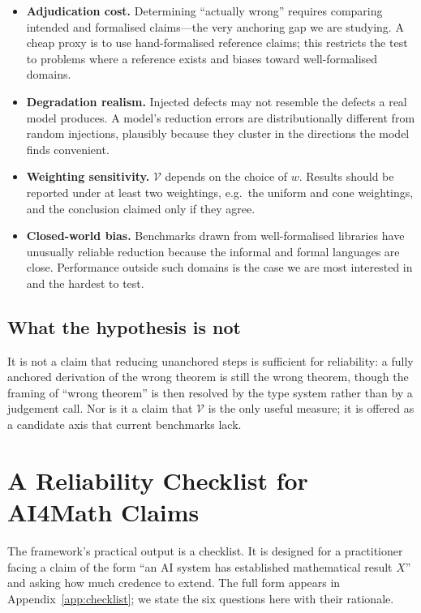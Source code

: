 \documentclass[11pt,a4paper]{article}
\theoremstyle{definition}
\theoremstyle{plain}
\theoremstyle{remark}
\newcommand{\V}{\mathcal{V}}           %
\begin{document}
\begin{itemize}
  \item \textbf{Adjudication cost.} Determining ``actually wrong'' requires
        comparing intended and formalised claims---the very anchoring gap we are
        studying. A cheap proxy is to use hand-formalised reference claims; this
        restricts the test to problems where a reference exists and biases
        toward well-formalised domains.
  \item \textbf{Degradation realism.} Injected defects may not resemble the
        defects a real model produces. A model's reduction errors are
        distributionally different from random injections, plausibly because
        they cluster in the directions the model finds convenient.
  \item \textbf{Weighting sensitivity.} $\V$ depends on the choice of $w$.
        Results should be reported under at least two weightings, e.g.\ the
        uniform and cone weightings, and the conclusion claimed only if they
        agree.
  \item \textbf{Closed-world bias.} Benchmarks drawn from well-formalised
        libraries have unusually reliable reduction because the informal and
        formal languages are close. Performance outside such domains is the
        case we are most interested in and the hardest to test.
\end{itemize}

\subsection{What the hypothesis is not}

It is not a claim that reducing unanchored steps is sufficient for reliability:
a fully anchored derivation of the wrong theorem is still the wrong theorem,
though the framing of ``wrong theorem'' is then resolved by the type system
rather than by a judgement call. Nor is it a claim that $\V$ is the only useful
measure; it is offered as a candidate axis that current benchmarks lack.

\section{A Reliability Checklist for AI4Math Claims}
\label{sec:checklist}

The framework's practical output is a checklist. It is designed for a
practitioner facing a claim of the form ``an AI system has established
mathematical result $X$'' and asking how much credence to extend. The full form
appears in Appendix~\ref{app:checklist}; we state the six questions here with
their rationale.
\end{document}

